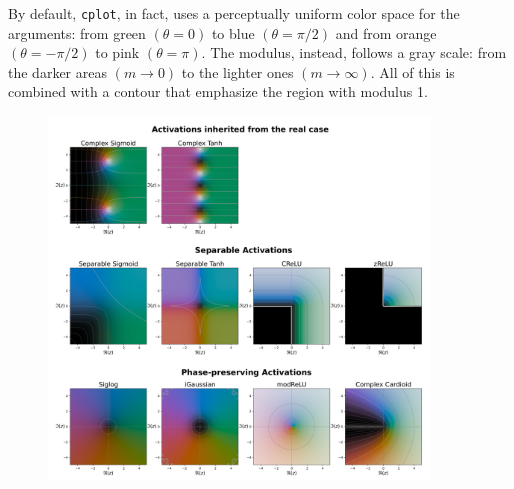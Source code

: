\documentclass[../main.tex]{subfiles}
\begin{document}
By default, \texttt{cplot}, in fact, uses a perceptually uniform color space for the arguments: from green $(\theta=0)$ to blue $(\theta=\pi/2)$ and from orange $(\theta=-\pi/2)$ to pink $(\theta=\pi)$. The modulus, instead, follows a gray scale: from the darker areas $(m\to 0)$ to the lighter ones $(m\to\infty)$. All of this is combined with a contour that emphasize the region with modulus 1.\\

\begin{figure}[!h]
	\centering
	\includegraphics[width=0.9\textwidth]{pictures/cmplx_activations}
\end{figure}
\end{document}
